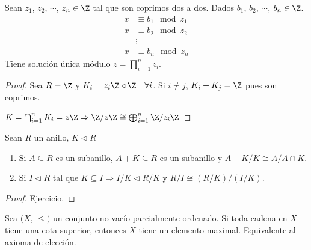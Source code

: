 \begin{corollary}
    Sean \(z_1\), \(z_2\), \(\cdots\), \(z_n \in \Z\) tal que son coprimos dos a dos. Dados \(b_1\), \(b_2\), \(\cdots\), \(b_n \in \Z\). \begin{align*}
        x & \equiv b_1 \mod z_1 \\
        x & \equiv b_2 \mod z_2 \\
          & \vdots              \\
        x & \equiv b_n \mod z_n
    \end{align*}
    Tiene solución única módulo \(z = \prod_{i = 1}^n z_i\).
    \begin{proof}
        Sea \(R = \Z\) y \(K_i = z_i \Z \triangleleft \Z \quad \forall i\). Si \(i \neq j\), \(K_i + K_j = \Z\) pues son coprimos.

        \(K = \bigcap_{i = 1}^n K_i = z \Z \Rightarrow \Z / z \Z \cong \bigoplus_{i = 1}^n \Z / z_i \Z\)
    \end{proof}
\end{corollary}

\begin{theorem}
    Sean \(R\) un anillo, \(K \triangleleft R\) \begin{enumerate}
        \item Si \(A \subseteq R\) es un subanillo, \(A + K \subseteq R\) es un subanillo y \(A+K/K \cong A / A \cap K\).
        \item Si \(I \triangleleft R\) tal que \(K \subseteq I \Rightarrow I/K \triangleleft R/K\) y \(R/I \cong (R/K)/(I/K)\).
    \end{enumerate}
    \begin{proof}
        Ejercicio.
    \end{proof}
\end{theorem}

\begin{lemma}[Zorn]
    Sea \((X\), \(\leq)\) un conjunto no vacío parcialmente ordenado. Si toda cadena en \(X\) tiene una cota superior, entonces \(X\) tiene un elemento maximal. Equivalente al axioma de elección.
\end{lemma}

